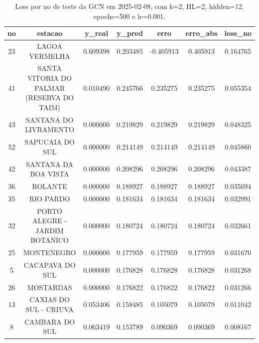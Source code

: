 \begin{table}[h]
\centering
\caption{Loss por no de teste da GCN em 2025-02-08, com k=2, HL=2, hidden=12, epochs=500 e lr=0.001.}
\label{tab:gcn_loss_k2_hl2_h12_e500_d20250208}
\begin{tabular}{ccccccc}
\toprule
no & estacao & y\_real & y\_pred & erro & erro\_abs & loss\_no \\
\midrule
23 & LAGOA VERMELHA & 0.609398 & 0.203485 & -0.405913 & 0.405913 & 0.164765 \\
41 & SANTA VITORIA DO PALMAR (RESERVA DO TAIM) & 0.010490 & 0.245766 & 0.235275 & 0.235275 & 0.055354 \\
43 & SANTANA DO LIVRAMENTO & 0.000000 & 0.219829 & 0.219829 & 0.219829 & 0.048325 \\
52 & SAPUCAIA DO SUL & 0.000000 & 0.214149 & 0.214149 & 0.214149 & 0.045860 \\
42 & SANTANA DA BOA VISTA & 0.000000 & 0.208296 & 0.208296 & 0.208296 & 0.043387 \\
36 & ROLANTE & 0.000000 & 0.188927 & 0.188927 & 0.188927 & 0.035694 \\
35 & RIO PARDO & 0.000000 & 0.181634 & 0.181634 & 0.181634 & 0.032991 \\
32 & PORTO ALEGRE - JARDIM BOTANICO & 0.000000 & 0.180724 & 0.180724 & 0.180724 & 0.032661 \\
25 & MONTENEGRO & 0.000000 & 0.177959 & 0.177959 & 0.177959 & 0.031670 \\
5 & CACAPAVA DO SUL & 0.000000 & 0.176828 & 0.176828 & 0.176828 & 0.031268 \\
26 & MOSTARDAS & 0.000000 & 0.176822 & 0.176822 & 0.176822 & 0.031266 \\
13 & CAXIAS DO SUL - CRIUVA & 0.053406 & 0.158485 & 0.105079 & 0.105079 & 0.011042 \\
8 & CAMBARA DO SUL & 0.063419 & 0.153789 & 0.090369 & 0.090369 & 0.008167 \\
\bottomrule
\end{tabular}
\end{table}
